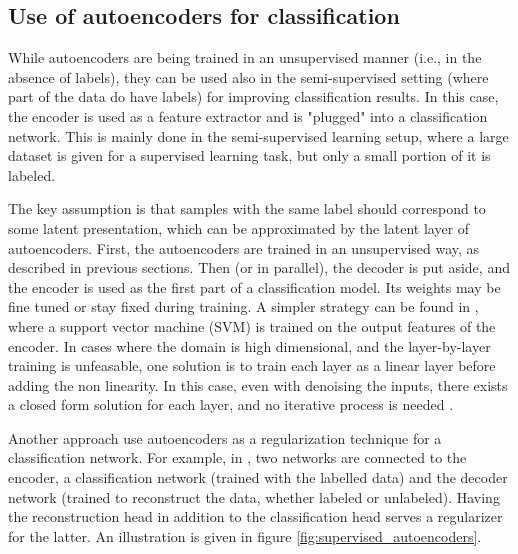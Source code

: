 \documentclass[graybox]{svmult}
\newcommand{\mb}[1]{\mathbf{#1}}
\newcommand{\bz}[0]{\mb{z}}
\newcommand{\btheta}[0]{\mb{\theta}}
\begin{document}

\subsection{Use of autoencoders for classification}

While autoencoders are being trained in an unsupervised manner (i.e., in the absence of labels), they can be used also in the semi-supervised setting (where part of the data do have labels) for improving classification results. 
In this case, the encoder is used as a feature extractor and is "plugged" into a classification network. This is mainly done in the semi-supervised learning setup, where a large dataset is given for a supervised learning task, but only a small portion of it is labeled. 

The key assumption is that samples with the same label should correspond to some latent presentation, which can be approximated by the latent layer of autoencoders. First, the autoencoders are trained in an unsupervised way, as described in previous sections. Then (or in parallel), the decoder is put aside, and the encoder is used as the first part of a classification model. Its weights may be fine tuned \cite{Why_Does_Unsupervised} or stay fixed during training. A simpler strategy can be found in \cite{autoencoders_classification}, where a support vector machine (SVM) is trained on the output features of the encoder.
In cases where the domain is high dimensional, and the layer-by-layer training is unfeasable, one solution is to train each layer as a linear layer before adding the non linearity. In this case, even with denoising the inputs, there exists a closed form solution for each layer, and no iterative process is needed \cite{Marginalized}.



Another approach use autoencoders as a regularization technique for a classification network.
For example, in \cite{supervised_autoencoders,Augmenting_Supervised_Neural_Networks}, two networks are connected to the encoder, a classification network (trained with the labelled data) and the decoder network (trained to reconstruct the data, whether labeled or unlabeled). Having the reconstruction head in addition to the classification head serves a regularizer for the latter.
An illustration is given in figure \ref{fig:supervised_autoencoders}.
\end{document}
